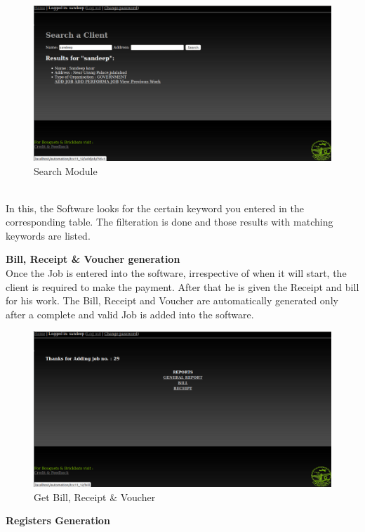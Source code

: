 \begin{figure}[h]
\vskip 2cm
\centering \includegraphics[scale=1.0]{search1.png}
\caption{Search Module}
\end{figure}\\

In this, the Software looks for the certain keyword you entered in the corresponding table. The filteration is done and those results with matching keywords are listed. 

\newpage
{\bf Bill, Receipt \& Voucher generation}\\

Once the Job is entered into the software, irrespective of when it will start, the client is required to make the payment. After that he is given the Receipt and bill for his work. The Bill, Receipt and Voucher are automatically generated only after a complete and valid Job is added into the software.
\begin{figure}[h]
\vskip 2cm
\centering \includegraphics[scale=1.0]{Bill.png}
\caption{Get Bill, Receipt \& Voucher}
\end{figure}

\newpage 
{\bf Registers Generation}\\

